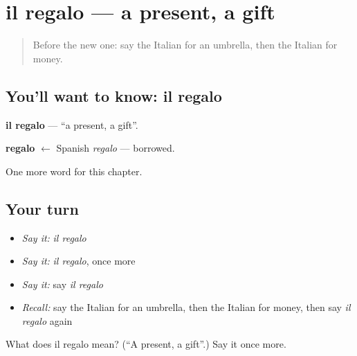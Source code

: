 \section[il regalo]{il regalo — a present, a gift}

\label{lesson:IT-C62-regalo}



\begin{quote}
Before the new one: say the Italian for an umbrella, then the Italian for money.
\end{quote}

\subsection*{You'll want to know: il regalo}
\textbf{il regalo} — \textquotedblleft{}a present, a gift\textquotedblright{}.

\begin{cousinweb}
\textbf{regalo} $\leftarrow$ Spanish \emph{regalo} — borrowed.
\end{cousinweb}

\begin{grammarlens}[title={What you've built}]
One more word for this chapter.
\end{grammarlens}

\subsection*{Your turn}
\begin{itemize}
\raggedright
  \item \emph{Say it:} \emph{il regalo}
  \item \emph{Say it:} \emph{il regalo}, once more
  \item \emph{Say it:} say \emph{il regalo}
  \item \emph{Recall:} say the Italian for an umbrella, then the Italian for money, then say \emph{il regalo} again
\end{itemize}

\begin{tcolorbox}[breakable,colback=teal!4,colframe=teal!35!black,title={Before you move on}]
What does il regalo mean? (\textquotedblleft{}A present, a gift\textquotedblright{}.) Say it once more.
\end{tcolorbox}
